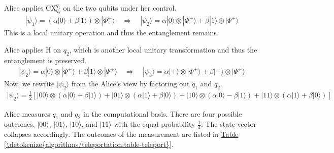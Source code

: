 \documentclass[letterpaper,10pt,english]{jupyterBook}
\begin{document}
\sphinxAtStartPar
{}

\sphinxAtStartPar
Alice applies CX\(_{q_2}^{q_1}\) on the two qubits under her control.
\begin{equation*}
\begin{split}
|\psi_1\rangle =\left( \alpha |0\rangle + \beta |1\rangle\right) \otimes |\Phi^{+}\rangle \quad \Rightarrow \quad  |\psi_2\rangle = \alpha |0\rangle \otimes |\Phi^{+}\rangle + \beta |1\rangle \otimes |\Psi^{+}\rangle
\end{split}
\end{equation*}
\sphinxAtStartPar
This is a local unitary operation and thus the entanglement remains.

\sphinxAtStartPar
{}

\sphinxAtStartPar
Alice applies H on \(q_2\), which is another local unitary transformation and thus the entanglement is preserved.
\begin{equation*}
\begin{split}
|\psi_2\rangle = \alpha |0\rangle \otimes |\Phi^{+}\rangle + \beta |1\rangle \otimes |\Psi^{+}\rangle  \quad \Rightarrow \quad |\psi_3\rangle = \alpha |+\rangle \otimes |\Phi^{+}\rangle + \beta |-\rangle \otimes |\Psi^{+}\rangle
\end{split}
\end{equation*}
\sphinxAtStartPar
Now, we rewrite \(|\psi_2\rangle\) from the Alice’s view by factoring out \(q_1\) and \(q_2\).
\begin{equation*}
\begin{split}
|\psi_2\rangle = \frac{1}{2}\left[|00\rangle\otimes \left(\alpha|0\rangle + \beta |1\rangle\right) + |01\rangle\otimes \left(\alpha|1\rangle + \beta |0\rangle\right) + |10\rangle\otimes \left(\alpha|0\rangle - \beta |1\rangle\right) + |11\rangle\otimes \left(\alpha|1\rangle + \beta |0\rangle\right) \right]
\end{split}
\end{equation*}
\sphinxAtStartPar
{}

\sphinxAtStartPar
Alice measures \(q_1\) and \(q_2\) in the computational basis.  There are four possible outcomes, \(|00\rangle\), \(|01\rangle\), \(|10\rangle\), and \(|11\rangle\) with the equal probability \(\frac{1}{4}\).  The state vector collapses accordingly.   The outcomes of the measurement are listed in \hyperref[\detokenize{algorithms/teleportation:table-teleport}]{Table \ref{\detokenize{algorithms/teleportation:table-teleport}}}.
\end{document}
